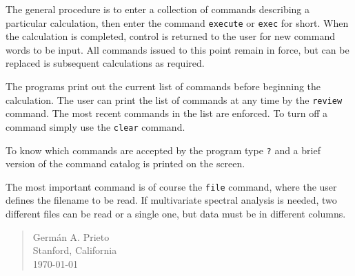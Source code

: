 \documentclass{article}
\begin{document}
The general procedure is to enter a collection of commands describing a particular calculation, then enter the command \texttt{execute} or \texttt{exec} for short. When the calculation is completed, control is returned to the user for new command words to be input. All commands issued to this point remain in force, but can be replaced is subsequent calculations as required. 

The programs print out the current list of commands before beginning the calculation. The user can print the list of commands at any time by the \texttt{review} command. The most recent commands in the list are enforced. To turn off a command simply use the \texttt{clear} command. 

To know which commands are accepted by the program type \texttt{?} and a brief version of the command catalog is printed on the screen. 

The most important command is of course the \texttt{file} command, where the user defines the filename to be read. If multivariate spectral analysis is needed, two different files can be read or a single one, but data must be in different columns. 
\vspace{0.5cm}

\begin{quote}
Germ\'an A. Prieto \\
Stanford, California \\
\today
\end{quote}
\end{document}
